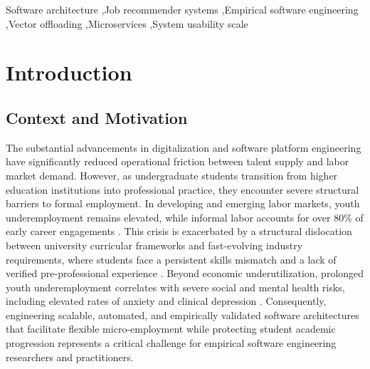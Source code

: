 \documentclass[a4paper,fleqn]{cas-dc}
\begin{document}
\begin{keywords}
Software architecture \sep Job recommender systems \sep Empirical software engineering \sep Vector offloading \sep Microservices \sep System usability scale
\end{keywords}

\maketitle

\section{Introduction}
\label{sec:intro}

\subsection{Context and Motivation}
The substantial advancements in digitalization and software platform engineering have significantly reduced operational friction between talent supply and labor market demand. However, as undergraduate students transition from higher education institutions into professional practice, they encounter severe structural barriers to formal employment. In developing and emerging labor markets, youth underemployment remains elevated, while informal labor accounts for over 80\% of early career engagements \cite{ilo2024}. This crisis is exacerbated by a structural dislocation between university curricular frameworks and fast-evolving industry requirements, where students face a persistent skills mismatch and a lack of verified pre-professional experience \cite{valencia2023}. Beyond economic underutilization, prolonged youth underemployment correlates with severe social and mental health risks, including elevated rates of anxiety and clinical depression \cite{yang2024, dupere2025}. Consequently, engineering scalable, automated, and empirically validated software architectures that facilitate flexible micro-employment while protecting student academic progression represents a critical challenge for empirical software engineering researchers and practitioners.
\end{document}
